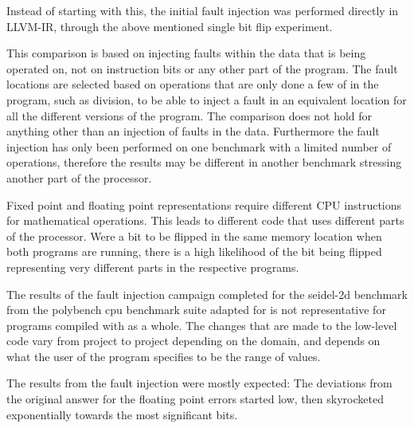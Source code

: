 Instead of starting with this, the initial fault injection was performed directly in LLVM-IR, through the above mentioned single bit flip experiment.

This comparison is based on injecting faults within the data that is being operated on, not on instruction bits or any other part of the program. The fault locations are selected based on operations that are only done a few of in the program, such as division, to be able to inject a fault in an equivalent location for all the different versions of the program. The comparison does not hold for anything other than an injection of faults in the data. Furthermore the fault injection has only been performed on one benchmark with a limited number of operations, therefore the results may be different in another benchmark stressing another part of the processor. 

Fixed point and floating point representations require different CPU instructions for mathematical operations. This leads to different code that uses different parts of the processor. Were a bit to be flipped in the same memory location when both programs are running, there is a high likelihood of the bit being flipped representing very different parts in the respective programs. 


The results of the fault injection campaign completed for the seidel-2d benchmark from the polybench cpu benchmark suite adapted for \taffo{} is not representative for programs compiled with \taffo{} as a whole. The changes that are made to the low-level code vary from project to project depending on the domain, and depends on what the user of the program specifies to be the range of values. 

The results from the fault injection were mostly expected: The deviations from the original answer for the floating point errors started low, then skyrocketed exponentially towards the most significant bits.






